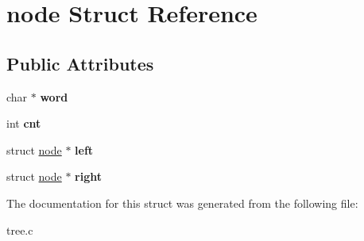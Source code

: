 \hypertarget{structnode}{}\section{node Struct Reference}
\label{structnode}
\subsection*{Public Attributes}
\begin{DoxyCompactItemize}
\item 
\mbox{\label{structnode_a13405da913d6af4193e14b60b8364d4d}} 
char $\ast$ {\bfseries word}
\item 
\mbox{\label{structnode_a067231ed14deda86ad0d011e702a80a3}} 
int {\bfseries cnt}
\item 
\mbox{\label{structnode_a3ce38490a651bfda86d88ff955e96abc}} 
struct \hyperlink{structnode}{node} $\ast$ {\bfseries left}
\item 
\mbox{\label{structnode_a875f75abfe22103500535b179828e4e3}} 
struct \hyperlink{structnode}{node} $\ast$ {\bfseries right}
\end{DoxyCompactItemize}


The documentation for this struct was generated from the following file\+:\begin{DoxyCompactItemize}
\item 
tree.\+c\end{DoxyCompactItemize}
